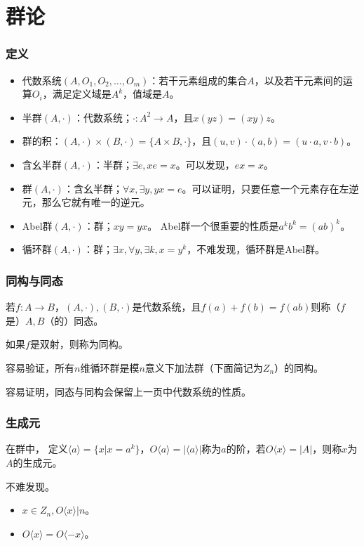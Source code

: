 \documentclass[10pt]{beamer}
\begin{document}
	\section{群论}
	\begin{frame}
		\frametitle{定义}
	
		\begin{itemize}
			\item 代数系统$(A,O_1,O_2,\dots,O_m)$：若干元素组成的集合$A$，以及若干元素间的运算$O_i$，满足定义域是$A^k$，值域是$A$。
			\item 半群$(A,\cdot)$：代数系统；$\cdot:A^2\rightarrow A$，且$x(yz)=(xy)z$。
			\item 群的积：$(A,\cdot)\times(B,\cdot)=\{A\times B,\cdot\}$，且$(u,v)\cdot(a,b)=(u\cdot a,v\cdot b)$。
			\item 含幺半群$(A,\cdot)$：半群；$\exists e,xe=x$。可以发现，$ex=x$。
			\item 群$(A,\cdot)$：含幺半群；$\forall x,\exists y,yx=e$。可以证明，只要任意一个元素存在左逆元，那么它就有唯一的逆元。
			\item Abel群$(A,\cdot)$：群；$xy=yx$。 Abel群一个很重要的性质是$a^kb^k=(ab)^k$。
			\item 循环群$(A,\cdot)$：群；$\exists x,\forall y,\exists k,x=y^k$，不难发现，循环群是Abel群。
		\end{itemize}

	\end{frame}
	\begin{frame}
		\frametitle{同构与同态}
	
		若$f:A\rightarrow B$，$(A,\cdot),(B,\cdot)$是代数系统，且$f(a)+f(b)=f(ab)$则称（$f$是）$A,B$（的）同态。

		如果$f$是双射，则称为同构。

		容易验证，所有$n$维循环群是模$n$意义下加法群（下面简记为$Z_n$）的同构。

		容易证明，同态与同构会保留上一页中代数系统的性质。
	
	\end{frame}
	\begin{frame}
		\frametitle{生成元}
	
		在群中， 定义$\langle a\rangle =\{x|x=a^k\}$，$O\langle a\rangle =|\langle a\rangle |$称为$a$的阶，若$O\langle x\rangle =|A|$，则称$x$为$A$的生成元。

		不难发现。
		
		\begin{itemize}
			\item $x\in Z_n,O\langle x\rangle |n$。
			\item $O\langle x\rangle =O\langle -x\rangle $。
		\end{itemize}
	\end{frame}
\end{document}
